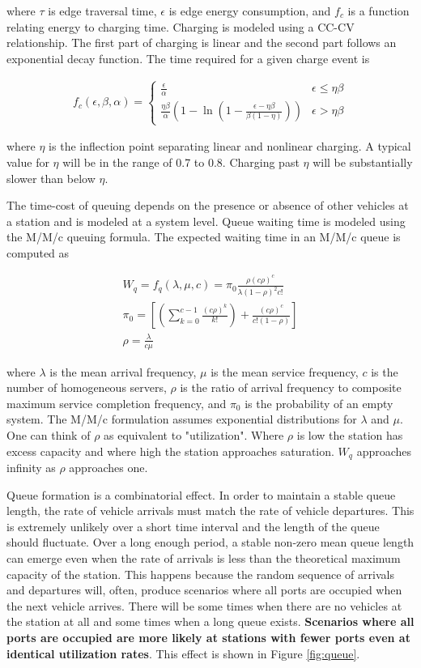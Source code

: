 where $\tau$ is edge traversal time, $\epsilon$ is edge energy consumption, and $f_c$ is a function relating energy to charging time. Charging is modeled using a CC-CV relationship. The first part of charging is linear and the second part follows an exponential decay function. The time required for a given charge event is

\begin{gather}
	f_{c}(\epsilon, \beta, \alpha) = \begin{cases}
		\frac{\epsilon}{\alpha} & \epsilon \leq \eta\beta \\
		\frac{\eta\beta}{\alpha}\left(1-\ln{\left(1-\frac{\epsilon - \eta\beta}{\beta(1-\eta)}\right)}\right) &  \epsilon > \eta\beta
	\end{cases}
\end{gather}

where $\eta$ is the inflection point separating linear and nonlinear charging. A typical value for $\eta$ will be in the range of 0.7 to 0.8. Charging past $\eta$ will be substantially slower than below $\eta$.

The time-cost of queuing depends on the presence or absence of other vehicles at a station and is modeled at a system level. Queue waiting time is modeled using the M/M/c queuing formula. The expected waiting time in an M/M/c queue is computed as

\begin{gather}
	W_q = f_{q}(\lambda, \mu, c) = \pi_0\frac{\rho(c\rho)^c}{\lambda(1-\rho)^2c!}\label{eq:w_q}\\
	\pi_0=\left[\left(\sum_{k = 0}^{c - 1}\frac{(c\rho)^k}{k!}\right) + \frac{(c\rho)^c}{c!(1 - \rho)}\right]\\
	\rho = \frac{\lambda}{c\mu}
\end{gather}

where $\lambda$ is the mean arrival frequency, $\mu$ is the mean service frequency, $c$ is the number of homogeneous servers, $\rho$ is the ratio of arrival frequency to composite maximum service completion frequency, and $\pi_0$ is the probability of an empty system. The M/M/c formulation assumes exponential distributions for $\lambda$ and $\mu$. One can think of $\rho$ as equivalent to "utilization". Where $\rho$ is low the station has excess capacity and where high the station approaches saturation. $W_q$ approaches infinity as $\rho$ approaches one.

Queue formation is a combinatorial effect. In order to maintain a stable queue length, the rate of vehicle arrivals must match the rate of vehicle departures. This is extremely unlikely over a short time interval and the length of the queue should fluctuate. Over a long enough period, a stable non-zero mean queue length can emerge even when the rate of arrivals is less than the theoretical maximum capacity of the station. This happens because the random sequence of arrivals and departures will, often, produce scenarios where all ports are occupied when the next vehicle arrives. There will be some times when there are no vehicles at the station at all and some times when a long queue exists. \textbf{Scenarios where all ports are occupied are more likely at stations with fewer ports even at identical utilization rates}. This effect is shown in Figure \ref{fig:queue}.

